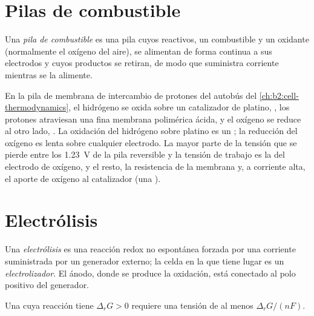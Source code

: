 \section{Pilas de combustible}

\begin{definition}\label{def:b2:batteries-electrolysis:fuel-cell}
Una \emph{pila de combustible} es una pila cuyos reactivos, un combustible y un
oxidante (normalmente el oxígeno del aire), se alimentan de forma continua a sus
electrodos y cuyos productos se retiran, de modo que suministra corriente mientras
se la alimente.
\end{definition}

En la pila de membrana de intercambio de protones del autobús del
\cref{ch:b2:cell-thermodynamics}, el hidrógeno se oxida sobre un catalizador de platino,
, los protones atraviesan una fina membrana polimérica ácida, y el oxígeno se
reduce al otro lado, . La oxidación del hidrógeno
sobre platino es un ; la reducción del oxígeno es lenta sobre cualquier
electrodo. La mayor parte de la tensión que se pierde entre los \qty{1.23}{V} de la pila
reversible y la tensión de trabajo es la  del electrodo de oxígeno,
y el resto, la resistencia de la membrana y, a corriente alta, el aporte de
oxígeno al catalizador (una ).

\section{Electrólisis}

\begin{definition}[Electrólisis]\label{def:b2:batteries-electrolysis:electrolysis}
Una \emph{electrólisis} es una reacción redox no espontánea
forzada por una corriente suministrada por un generador externo; la celda en la que
tiene lugar es un \emph{electrolizador}. El ánodo, donde se
produce la oxidación, está conectado al polo positivo del generador.
\end{definition}

\begin{proposition}\label{prop:b2:batteries-electrolysis:minimum-voltage}
Una  cuya reacción tiene $\Delta_r G > 0$ requiere una tensión de al
menos $\Delta_r G/(nF)$.
\end{proposition}


